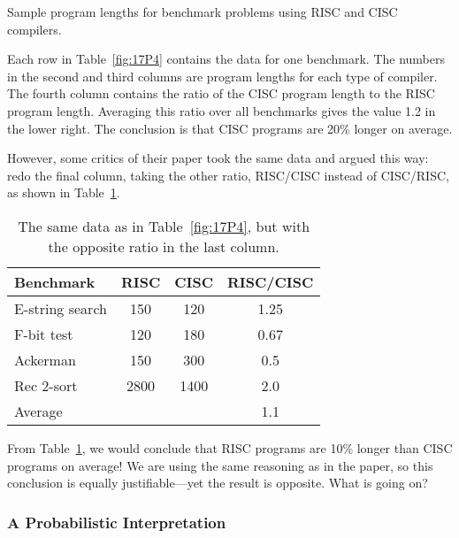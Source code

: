 \begin{editingnotes}
\begin{table}
\caption{Sample program lengths for benchmark problems using RISC and
  CISC compilers.}

\label{fig:17P4}

\end{table}

Each row in Table~\ref{fig:17P4} contains the data for one benchmark.
The numbers in the second and third columns are program lengths for
each type of compiler.  The fourth column contains the ratio of the
CISC program length to the RISC program length.  Averaging this ratio
over all benchmarks gives the value 1.2 in the lower right.  The
conclusion is that CISC programs are 20\% longer on average.

However, some critics of their paper took the same data and argued this
way: redo the final column, taking the other ratio, RISC/CISC instead of
CISC/RISC, as shown in Table~\ref{fig:17P5}.

\begin{table}

\begin{tabular}{lccc}
Benchmark        & RISC          & CISC          & RISC/CISC\\
\hline
E-string search  & 150           & 120           & 1.25 \\
F-bit test       & 120           & 180           & 0.67 \\
Ackerman         & 150           & 300           & 0.5 \\
Rec 2-sort       & 2800          & 1400          & 2.0 \\
\hline
Average          &               &               & 1.1
\end{tabular}

\caption{The same data as in Table~\ref{fig:17P4}, but with the
  opposite ratio in the last column.}

\label{fig:17P5}

\end{table}

From Table~\ref{fig:17P5}, we would conclude that RISC programs are
10\% longer than CISC programs on average!  We are using the same
reasoning as in the paper, so this conclusion is equally
justifiable---yet the result is opposite.  What is going on?

\subsubsection{A Probabilistic Interpretation}


\end{editingnotes}
